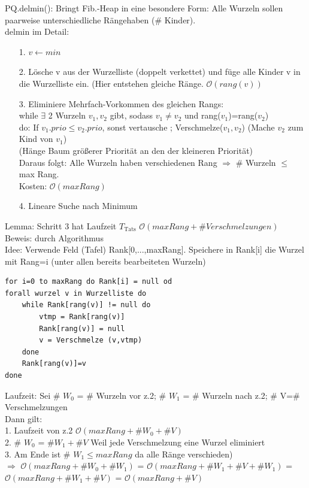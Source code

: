 \documentclass[a4paper]{article}
\newcommand{\oh}[1]{$\mathcal{O}(#1)$}
\begin{document}
PQ.delmin(): Bringt Fib.-Heap in eine besondere Form: 
Alle Wurzeln sollen paarweise unterschiedliche Rängehaben (\# Kinder).\\
delmin im Detail:\begin{enumerate}
\item[1.] $v\leftarrow min$
\item[2.] Lösche v aus der Wurzelliste (doppelt verkettet) und füge alle Kinder v in die Wurzelliste ein. (Hier entstehen gleiche Ränge. \oh{rang(v)}
\item[3.] Eliminiere Mehrfach-Vorkommen des gleichen Rangs:\\
while $\exists$ 2 Wurzeln $v_1,v_2$ gibt, sodass $v_1\neq v_2$ und rang($v_1$)=rang($v_2$)\\
do: If $v_1.prio\leq v_2.prio$, sonst vertausche ; Verschmelze($v_1,v_2$) (Mache $v_2$ zum Kind von $v_1$)\\
(Hänge Baum größerer Priorität an den der kleineren Priorität)\\
Daraus folgt: Alle Wurzeln haben verschiedenen Rang $\Rightarrow$ \# Wurzeln $\leq$ max Rang.\\
Kosten: \oh{maxRang}\\
\item[4.]Lineare Suche nach Minimum
\end{enumerate}
Lemma: Schritt 3 hat Laufzeit $T_{\text{Tats}}$ \oh{maxRang + \# Verschmelzungen}\\
Beweis: durch Algorithmus\\
Idee: Verwende Feld (Tafel) Rank[0,...,maxRang]. Speichere in Rank[i] die Wurzel mit Rang=i (unter allen bereits bearbeiteten Wurzeln)
\begin{lstlisting}
for i=0 to maxRang do Rank[i] = null od
forall wurzel v in Wurzelliste do
	while Rank[rang(v)] != null do
		vtmp = Rank[rang(v)]
		Rank[rang(v)] = null
		v = Verschmelze (v,vtmp)
	done
	Rank[rang(v)]=v
done
\end{lstlisting}
Laufzeit: Sei \# $W_0$ = \# Wurzeln vor z.2; \# $W_1$ = \# Wurzeln nach z.2; \# V=\# Verschmelzungen \\
Dann gilt: \\
1. Laufzeit von z.2 \oh{maxRang + \# W_0 + \# V}\\
2. \# $W_0$ = $\# W_1 + \# V$ Weil jede Verschmelzung eine Wurzel eliminiert\\
3. Am Ende ist \# $W_1\leq maxRang$ da alle Ränge verschieden)\\
$\Rightarrow$ \oh{maxRang +\# W_0 + \# W_1} = \oh{maxRang + \# W_1 + \# V + \# W_1} = \oh{maxRang + \# W_1 + \# V} = \oh{maxRang+\# V}\\
\end{document}
